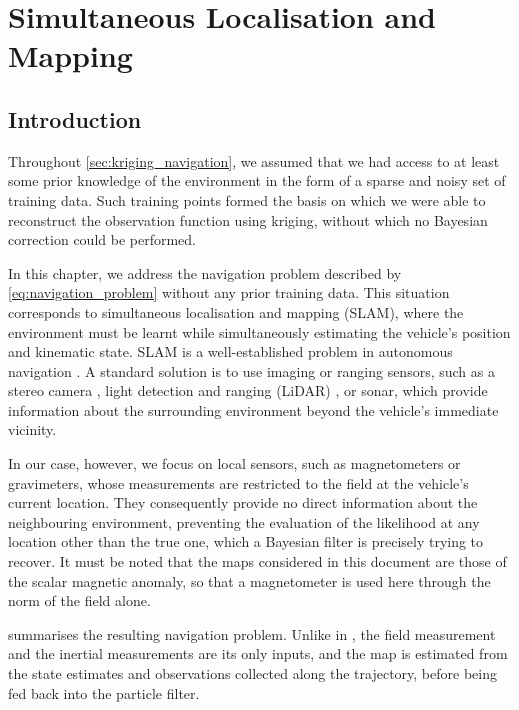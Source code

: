 \chapter{Simultaneous Localisation and Mapping}\label{sec:SLAM}

\vfill
\localtableofcontents
\vfill
\newpage

\section{Introduction}

Throughout \cref{sec:kriging_navigation}, we assumed that we had access to at least some prior knowledge of the environment in the form of a sparse and noisy set of training data. Such training points formed the basis on which we were able to reconstruct the observation function using kriging, without which no Bayesian correction could be performed.

In this chapter, we address the navigation problem described by \eqref{eq:navigation_problem} without any prior training data. This situation corresponds to simultaneous localisation and mapping (SLAM), where the environment must be learnt while simultaneously estimating the vehicle's position and kinematic state. SLAM is a well-established problem in autonomous navigation \cite{bib:SLAM-tutorial,bib:SLAM-survey}. A standard solution is to use imaging or ranging sensors, such as a stereo camera \cite{bib:ORB-SLAM2}, light detection and ranging (LiDAR) \cite{bib:LOAM,bib:Cartographer}, or sonar, which provide information about the surrounding environment beyond the vehicle's immediate vicinity.

In our case, however, we focus on local sensors, such as magnetometers or gravimeters, whose measurements are restricted to the field at the vehicle's current location. They consequently provide no direct information about the neighbouring environment, preventing the evaluation of the likelihood at any location other than the true one, which a Bayesian filter is precisely trying to recover. It must be noted that the maps considered in this document are those of the scalar magnetic anomaly, so that a magnetometer is used here through the norm of the field alone.

 summarises the resulting navigation problem. Unlike in , the field measurement and the inertial measurements are its only inputs, and the map is estimated from the state estimates and observations collected along the trajectory, before being fed back into the particle filter.

